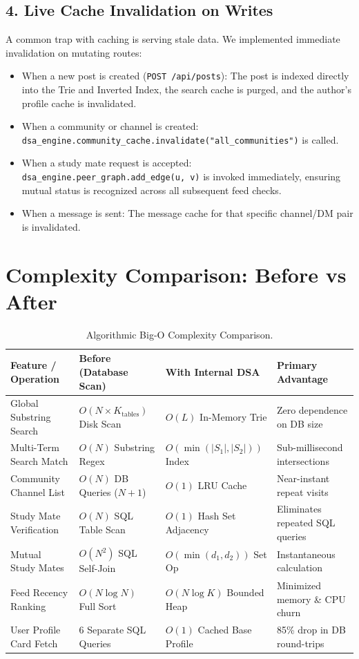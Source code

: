 \documentclass[11pt,a4paper]{article}
\begin{document}
\subsection{4. Live Cache Invalidation on Writes}
A common trap with caching is serving stale data. We implemented immediate invalidation on mutating routes:
\begin{itemize}
    \item When a new post is created (\texttt{POST /api/posts}): The post is indexed directly into the Trie and Inverted Index, the search cache is purged, and the author's profile cache is invalidated.
    \item When a community or channel is created: \texttt{dsa\_engine.community\_cache.invalidate("all\_communities")} is called.
    \item When a study mate request is accepted: \texttt{dsa\_engine.peer\_graph.add\_edge(u, v)} is invoked immediately, ensuring mutual status is recognized across all subsequent feed checks.
    \item When a message is sent: The message cache for that specific channel/DM pair is invalidated.
\end{itemize}

\section{Complexity Comparison: Before vs After}

\begin{table}[h!]
\centering
\small
\begin{tabular}{@{}llll@{}}
\toprule
\textbf{Feature / Operation} & \textbf{Before (Database Scan)} & \textbf{With Internal DSA} & \textbf{Primary Advantage} \\ \midrule
Global Substring Search & $O(N \times K_{\text{tables}})$ Disk Scan & $O(L)$ In-Memory Trie & Zero dependence on DB size \\
Multi-Term Search Match & $O(N)$ Substring Regex & $O(\min(|S_1|, |S_2|))$ Index & Sub-millisecond intersections \\
Community Channel List & $O(N)$ DB Queries ($N+1$) & $O(1)$ LRU Cache & Near-instant repeat visits \\
Study Mate Verification & $O(N)$ SQL Table Scan & $O(1)$ Hash Set Adjacency & Eliminates repeated SQL queries \\
Mutual Study Mates & $O(N^2)$ SQL Self-Join & $O(\min(d_1, d_2))$ Set Op & Instantaneous calculation \\
Feed Recency Ranking & $O(N \log N)$ Full Sort & $O(N \log K)$ Bounded Heap & Minimized memory \& CPU churn \\
User Profile Card Fetch & 6 Separate SQL Queries & $O(1)$ Cached Base Profile & 85\% drop in DB round-trips \\ \bottomrule
\end{tabular}
\caption{Algorithmic Big-O Complexity Comparison.}
\end{table}
\end{document}
